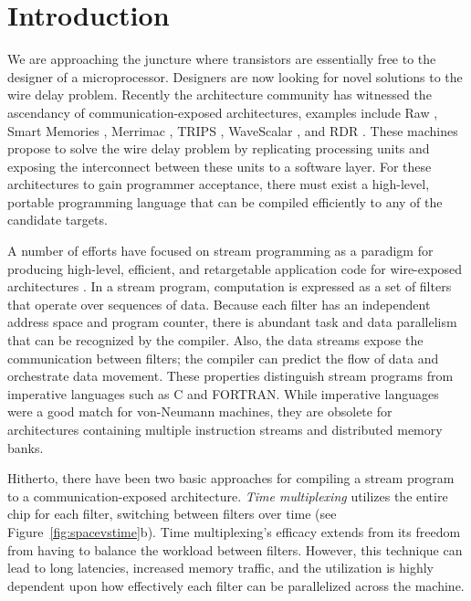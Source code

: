 \section{Introduction}

We are approaching the juncture where transistors are essentially free
to the designer of a microprocessor.  Designers are now looking for
novel solutions to the wire delay problem. Recently the architecture
community has witnessed the ascendancy of communication-exposed
architectures, examples include Raw \cite{raw}, Smart Memories
\cite{smartmemories}, Merrimac \cite{merrimac-sc03}, TRIPS
\cite{trips}, WaveScalar \cite{wavescalar}, and RDR \cite{rdr}.  These
machines propose to solve the wire delay problem by replicating
processing units and exposing the interconnect between these units to
a software layer.  For these architectures to gain programmer
acceptance, there must exist a high-level, portable programming
language that can be compiled efficiently to any of the candidate
targets.

A number of efforts have focused on stream programming as a paradigm
for producing high-level, efficient, and retargetable application code
for wire-exposed architectures \cite{streamit-asplos,imagine-ieee,merrimac-sc03,trips-isca03}.
In a stream program, computation is expressed as a set of filters that
operate over sequences of data.  Because each filter has an
independent address space and program counter, there is abundant task
and data parallelism that can be recognized by the compiler.  Also,
the data streams expose the communication between filters; the
compiler can predict the flow of data and orchestrate data movement.
These properties distinguish stream programs from imperative languages
such as C and FORTRAN.  While imperative languages were a good match
for von-Neumann machines, they are obsolete for architectures
containing multiple instruction streams and distributed memory banks.

Hitherto, there have been two basic approaches for compiling a stream
program to a communication-exposed architecture.  {\it Time
multiplexing} utilizes the entire chip for each filter, switching
between filters over time (see Figure~\ref{fig:spacevstime}b).  Time
multiplexing's efficacy extends from its freedom from having to
balance the workload between filters.  However, this technique can
lead to long latencies, increased memory traffic, and the utilization
is highly dependent upon how effectively each filter can be
parallelized across the machine.

